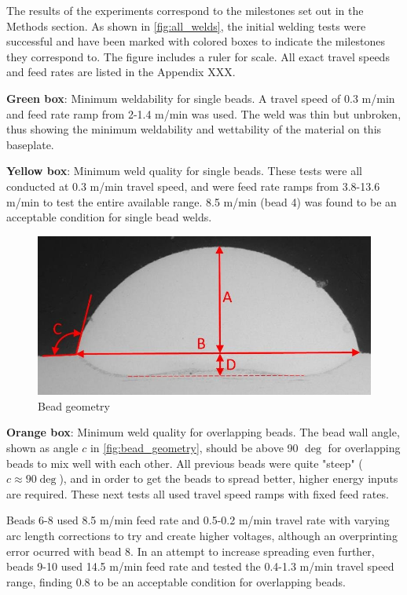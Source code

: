 The results of the experiments correspond to the milestones set out in the Methods section. As shown in \autoref{fig:all_welds}, the initial welding tests were successful and have been marked with colored boxes to indicate the milestones they correspond to. The figure includes a ruler for scale. All exact travel speeds and feed rates are listed in the Appendix XXX.

\textbf{Green box}: Minimum weldability for single beads. A travel speed of 0.3 m/min and feed rate ramp from 2-1.4 m/min was used. The weld was thin but unbroken, thus showing the minimum weldability and wettability of the material on this baseplate.

\textbf{Yellow box}: Minimum weld quality for single beads. These tests were all conducted at 0.3 m/min travel speed, and were feed rate ramps from 3.8-13.6 m/min to test the entire available range. 8.5 m/min (bead 4) was found to be an acceptable condition for single bead welds.

\begin{figure}[H]
    \centering
    \includegraphics[width=\linewidth]{images/bead_geometry.png}
    \caption{Bead geometry \cite{Dinovitzer_Chen_Laliberte_Huang_Frei_2019}}
    \label{fig:bead_geometry}
\end{figure}

\textbf{Orange box}: Minimum weld quality for overlapping beads.
The bead wall angle, shown as angle $c$ in \autoref{fig:bead_geometry}, should be above 90 $\deg$ for overlapping beads to mix well with each other. All previous beads were quite "steep" ($c \approx 90 \deg$), and in order to get the beads to spread better, higher energy inputs are required. These next tests all used travel speed ramps with fixed feed rates.

Beads 6-8 used 8.5 m/min feed rate and 0.5-0.2 m/min travel rate with varying arc length corrections to try and create higher voltages, although an overprinting error ocurred with bead 8. In an attempt to increase spreading even further, beads 9-10 used 14.5 m/min feed rate and tested the 0.4-1.3 m/min travel speed range, finding 0.8 to be an acceptable condition for overlapping beads.

